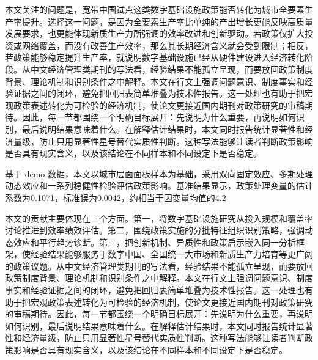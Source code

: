 \documentclass[12pt,a4paper]{article}
\begin{document}
本文关注的问题是，宽带中国试点这类数字基础设施政策能否转化为城市全要素生产率提升。选择这一问题，是因为全要素生产率比单纯的产出增长更能反映高质量发展要求，也更能体现新质生产力所强调的效率改进和创新驱动。若政策仅扩大投资或网络覆盖，而没有改善生产效率，那么其长期经济含义就会受到限制；相反，若政策能够稳定提升生产率，就说明数字基础设施已经从硬件建设进入经济转化阶段。从中文经济管理类期刊的写法看，经验结果不能孤立呈现，而要放回政策制度背景、理论机制和识别条件之中解释。本文在行文上强调问题意识、制度事实和经验证据之间的闭环，避免把回归表简单堆叠为技术性报告。这一处理也有助于把宏观政策表述转化为可检验的经济机制，使论文更接近国内期刊对政策研究的审稿期待。因此，每一节都围绕一个明确目标展开：先说明为什么重要，再说明如何识别，最后说明结果意味着什么。在解释估计结果时，本文同时报告统计显著性和经济量级，防止只用显著性星号替代实质性判断。这种写法能够让读者判断政策影响是否具有现实含义，以及该结论在不同样本和不同设定下是否稳定。

基于 demo 数据，本文以城市层面面板样本为基础，采用双向固定效应、多期处理动态效应和一系列稳健性检验评估政策影响。基准结果显示，政策处理变量的估计系数为0.1071，标准误为0.0042，约相当于因变量均值的4.2%

本文的贡献主要体现在三个方面。第一，将数字基础设施研究从投入规模和覆盖率讨论推进到效率绩效评估。第二，围绕政策实施的分批特征组织识别策略，强调动态效应和平行趋势诊断。第三，把创新机制、异质性和政策启示嵌入同一分析框架，使经验结果能够服务于数字中国、全国统一大市场和新质生产力培育等更广阔的政策议题。从中文经济管理类期刊的写法看，经验结果不能孤立呈现，而要放回政策制度背景、理论机制和识别条件之中解释。本文在行文上强调问题意识、制度事实和经验证据之间的闭环，避免把回归表简单堆叠为技术性报告。这一处理也有助于把宏观政策表述转化为可检验的经济机制，使论文更接近国内期刊对政策研究的审稿期待。因此，每一节都围绕一个明确目标展开：先说明为什么重要，再说明如何识别，最后说明结果意味着什么。在解释估计结果时，本文同时报告统计显著性和经济量级，防止只用显著性星号替代实质性判断。这种写法能够让读者判断政策影响是否具有现实含义，以及该结论在不同样本和不同设定下是否稳定。
\end{document}
